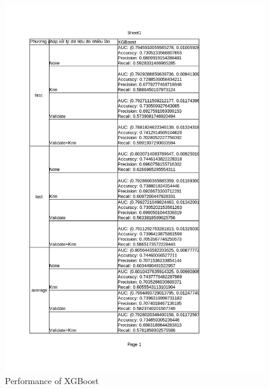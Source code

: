 \documentclass[../main.tex]{subfiles}
\begin{document}
 \begin{figure}[H]
    \centering
    \includegraphics[width=\textwidth]{Figure/KidneyResultNoLimit-new_XGBoost.png}
    \caption{Performance of XGBoost}
    \label{fig:KidneyResultNoLimit-new_XGBoost}
\end{figure}
\end{document}
